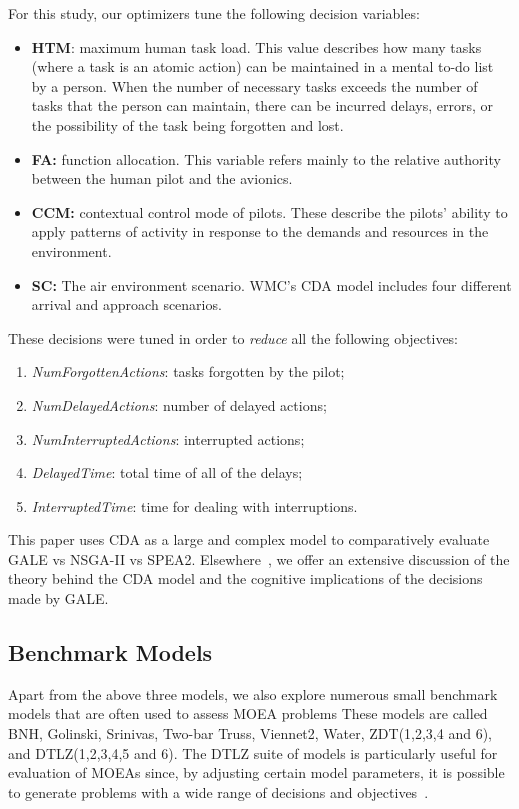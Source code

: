 \documentclass[10pt,journal,compsoc]{IEEEtran}
\newcommand{\bi}{\begin{itemize}}
\newcommand{\ei}{\end{itemize}}
\newcommand{\be}{\begin{enumerate}}
\newcommand{\ee}{\end{enumerate}}
\begin{document}
For this study, our optimizers tune the following decision variables:
\bi
\item {\bf HTM}: maximum human task load. This value describes how many tasks (where a task is an atomic action) can be maintained in a mental to-do list by a person.  When the number of necessary tasks exceeds the number of tasks that the person can maintain, there can be incurred delays, errors, or the possibility of the task being forgotten and lost.
\item {\bf FA:} function allocation. This variable refers mainly to the relative authority between the human pilot and the avionics.
\item {\bf CCM:} contextual control mode of pilots. These describe the pilots' ability to apply patterns of activity in response to the demands and resources in the environment.
\item {\bf SC:}
The air environment scenario. WMC’s CDA model includes four different arrival and approach scenarios.
\ei
These decisions were tuned in order to {\em reduce} all the following objectives:
\be
\item  
\emph{NumForgottenActions}:
tasks forgotten by the pilot;
\item 
{\em NumDelayedActions}: number of delayed actions;
\item
 \emph{NumInterruptedActions}: 
interrupted actions;
\item 
\emph{DelayedTime}:
total time of all of the delays;
\item 
{\em InterruptedTime}: time for
dealing with interruptions.
\ee
This paper   uses CDA as a large and complex model
to comparatively evaluate  GALE vs NSGA-II vs SPEA2.
Elsewhere~\cite{krall15:hms}, we offer an extensive discussion of the theory behind the CDA model
and the cognitive implications of the decisions made by GALE. 

\subsection{Benchmark Models}

Apart from the above three models, we also explore numerous small benchmark models that are often used to assess MOEA problems 
These models are called BNH, Golinski, Srinivas, Two-bar Truss, Viennet2, Water, ZDT(1,2,3,4 and 6), and DTLZ(1,2,3,4,5 and 6).
The  DTLZ suite of models is particularly useful for evaluation of MOEAs since, by adjusting certain model  parameters, it is possible to generate problems with a wide range of decisions and objectives~\cite{Zitzler2000zdtpaper,dtlz2001a}.
\end{document}
